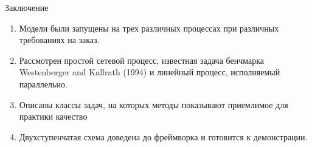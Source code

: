 \documentclass{beamer}
\begin{document}
\begin{frame}{Заключение}
	\begin{enumerate}
	\item Модели были запущены на трех различных процессах при различных требованиях на заказ.
	\item Рассмотрен простой сетевой процесс, известная задача бенчмарка Westenberger and Kallrath (1994) и линейный процесс, исполняемый параллельно.
	\item Описаны классы задач, на которых методы показывают приемлимое для практики качество
	\item Двухступенчатая схема доведена до фреймворка и готовится к демонстрации.
	
\end{enumerate}

\end{frame}
\end{document}
